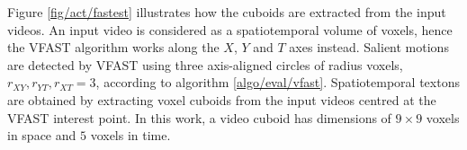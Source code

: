 Figure \ref{fig/act/fastest} illustrates how the cuboids are extracted from the input videos.
An input video is considered as a spatiotemporal volume of voxels, hence the VFAST algorithm works along the $X$, $Y$ and $T$ axes instead. Salient motions are detected by VFAST using three axis-aligned circles of radius voxels, \ie $r_{XY}, r_{YT}, r_{XT} = 3$, according to algorithm \ref{algo/eval/vfast}. Spatiotemporal textons are obtained by extracting voxel cuboids from the input videos centred at the VFAST interest point. In this work, a video cuboid has dimensions of $9 \times 9$ voxels in space and $5$ voxels in time.

